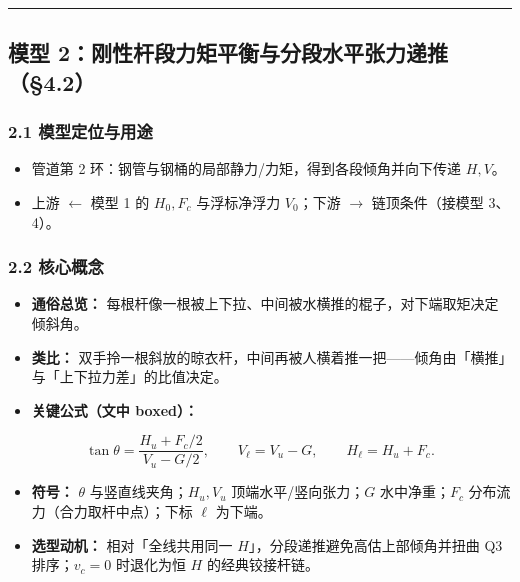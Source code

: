 \documentclass[UTF8,a4paper,zihao=-4]{ctexart}
\begin{document}
\vspace{0.4em}\hrule\vspace{0.4em}

\subsection{\texorpdfstring{模型 2：刚性杆段力矩平衡与分段水平张力递推（§4.2）}{模型 2：刚性杆段力矩平衡与分段水平张力递推（§4.2）}}

\subsubsection{\texorpdfstring{2.1 模型定位与用途}{2.1 模型定位与用途}}
\begin{itemize}[leftmargin=1.5em]
\item 管道第 2 环：钢管与钢桶的局部静力/力矩，得到各段倾角并向下传递 \(H,V\)。
\item 上游 $\leftarrow$ 模型 1 的 \(H_0,F_c\) 与浮标净浮力 \(V_0\)；下游 $\rightarrow$ 链顶条件（接模型 3、4）。
\end{itemize}

\subsubsection{\texorpdfstring{2.2 核心概念}{2.2 核心概念}}
\begin{itemize}[leftmargin=1.5em]
\item \textbf{通俗总览：} 每根杆像一根被上下拉、中间被水横推的棍子，对下端取矩决定倾斜角。
\item \textbf{类比：} 双手拎一根斜放的晾衣杆，中间再被人横着推一把------倾角由「横推」与「上下拉力差」的比值决定。
\item \textbf{关键公式（文中 boxed）：}
\end{itemize}
  \[
  \tan\theta=\frac{H_u+F_c/2}{V_u-G/2},\qquad V_\ell=V_u-G,\qquad H_\ell=H_u+F_c.
  \]
\begin{itemize}[leftmargin=1.5em]
\item \textbf{符号：} \(\theta\) 与竖直线夹角；\(H_u,V_u\) 顶端水平/竖向张力；\(G\) 水中净重；\(F_c\) 分布流力（合力取杆中点）；下标 \(\ell\) 为下端。
\item \textbf{选型动机：} 相对「全线共用同一 \(H\)」，分段递推避免高估上部倾角并扭曲 Q3 排序；\(v_c=0\) 时退化为恒 \(H\) 的经典铰接杆链。
\end{itemize}
\end{document}
